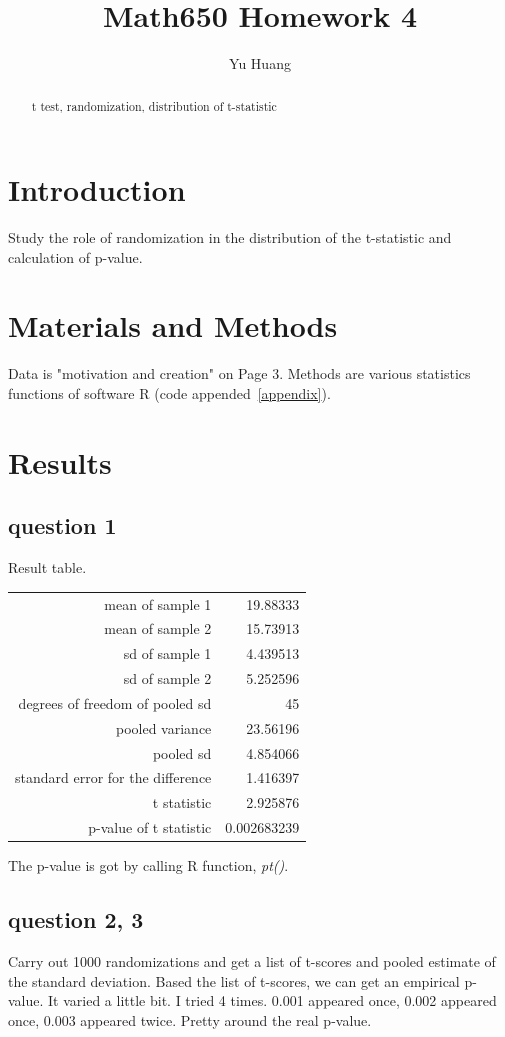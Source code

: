 \documentclass[a4paper,10pt]{article}
\title{Math650 Homework 4}
\author{Yu Huang}
\begin{document}
\maketitle

\begin{abstract}
t test, randomization, distribution of t-statistic
\end{abstract}

\section{Introduction}
Study the role of randomization in the distribution of the t-statistic and calculation of p-value.

\section{Materials and Methods}
Data is "motivation and creation" on Page 3. Methods are various statistics functions of software R (code appended~\ref{appendix}).

\section{Results}
\subsection{question 1}
Result table.

\begin{tabular}{|r|r|}
\hline
mean of sample 1 & 19.88333\\
mean of sample 2 & 15.73913\\
sd of sample 1& 4.439513\\
sd of sample 2& 5.252596\\
degrees of freedom of pooled sd & 45\\
pooled variance & 23.56196\\
pooled sd & 4.854066\\
standard error for the difference & 1.416397\\
t statistic & 2.925876\\
p-value of t statistic & 0.002683239\\
\hline
\end{tabular}

The p-value is got by calling R function, \emph{pt()}.

\subsection{question 2, 3}
Carry out 1000 randomizations and get a list of t-scores and pooled estimate of the standard deviation. Based the list of t-scores, we can get an empirical p-value. It varied a little bit. I tried 4 times. 0.001 appeared once, 0.002 appeared once, 0.003 appeared twice. Pretty around the real p-value.
\end{document}
